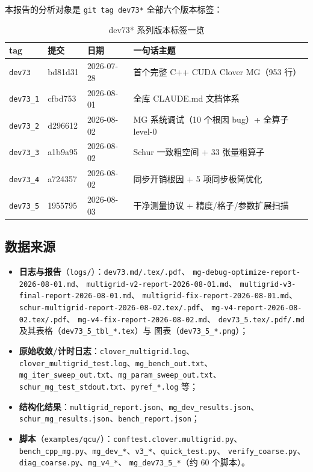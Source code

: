 \documentclass[11pt,a4paper]{article}
\begin{document}
本报告的分析对象是 \texttt{git tag dev73*} 全部六个版本标签：

\begin{table}[H]
\centering
\begin{tabular}{llll}
\toprule
tag & 提交 & 日期 & 一句话主题 \\
\midrule
\texttt{dev73}   & bd81d31 & 2026-07-28 & 首个完整 C++ CUDA Clover MG（953 行）\\
\texttt{dev73\_1} & cfbd753 & 2026-08-01 & 全库 CLAUDE.md 文档体系 \\
\texttt{dev73\_2} & d296612 & 2026-08-02 & MG 系统调试（10 个根因 bug）+ 全算子 level-0 \\
\texttt{dev73\_3} & a1b9a95 & 2026-08-02 & Schur 一致粗空间 + 33 张量粗算子 \\
\texttt{dev73\_4} & a724357 & 2026-08-02 & 同步开销根因 + 5 项同步极简优化 \\
\texttt{dev73\_5} & 1955795 & 2026-08-03 & 干净测量协议 + 精度/格子/参数扩展扫描 \\
\bottomrule
\end{tabular}
\caption{dev73* 系列版本标签一览}
\end{table}

\subsection{数据来源}
\label{sec:sources}

\begin{itemize}
  \item \textbf{日志与报告}（\texttt{logs/}）：\texttt{dev73.md/.tex/.pdf}、
        \texttt{mg-debug-optimize-report-2026-08-01.md}、
        \texttt{multigrid-v2-report-2026-08-01.md}、
        \texttt{multigrid-v3-final-report-2026-08-01.md}、
        \texttt{multigrid-fix-report-2026-08-01.md}、
        \texttt{schur-multigrid-report-2026-08-02.tex/.pdf}、
        \texttt{mg-v4-report-2026-08-02.tex/.pdf}、
        \texttt{mg-v4-fix-report-2026-08-02.md}、
        \texttt{dev73\_5.tex/.pdf/.md} 及其表格（\texttt{dev73\_5\_tbl\_*.tex}）与
        图表（\texttt{dev73\_5\_*.png}）；
  \item \textbf{原始收敛/计时日志}：\texttt{clover\_multigrid.log}、
        \texttt{clover\_multigrid\_test.log}、\texttt{mg\_bench\_out.txt}、
        \texttt{mg\_iter\_sweep\_out.txt}、\texttt{mg\_param\_sweep\_out.txt}、
        \texttt{schur\_mg\_test\_stdout.txt}、\texttt{pyref\_*.log} 等；
  \item \textbf{结构化结果}：\texttt{multigrid\_report.json}、\texttt{mg\_dev\_results.json}、
        \texttt{schur\_mg\_results.json}、\texttt{bench\_report.json}；
  \item \textbf{脚本}（\texttt{examples/qcu/}）：\texttt{conftest.clover.multigrid.py}、
        \texttt{bench\_cpp\_mg.py}、\texttt{mg\_dev\_*}、\texttt{v3\_*}、\texttt{quick\_test.py}、
        \texttt{verify\_coarse.py}、\texttt{diag\_coarse.py}、\texttt{mg\_v4\_*}、
        \texttt{mg\_dev73\_5\_*}（约 60 个脚本）。
\end{itemize}
\end{document}
